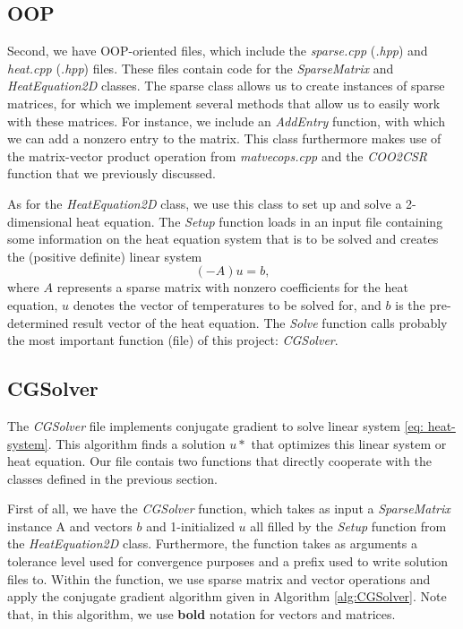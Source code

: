 \documentclass[12pt, a4paper]{article}
\begin{document}
\subsection{OOP}
Second, we have OOP-oriented files, which include the \textit{sparse.cpp} 
(\textit{.hpp}) and \textit{heat.cpp} (\textit{.hpp}) files. These files contain 
code for the \textit{SparseMatrix} and \textit{HeatEquation2D} classes. The 
sparse class allows us to create instances of sparse matrices, for which we 
implement several methods that allow us to easily work with these matrices. For
instance, we include an \textit{AddEntry} function, with which we can add a 
nonzero entry to the matrix. This class furthermore makes use of the 
matrix-vector product operation from \textit{matvecops.cpp} and the 
\textit{COO2CSR} function that we previously discussed. 

As for the \textit{HeatEquation2D} class, we use this class to set up and 
solve a 2-dimensional heat equation. The \textit{Setup} function loads in an
input file containing some information on the heat equation system that is to
be solved and creates the (positive definite) linear system
\begin{equation}
\label{eq: heat-system}
    (-A)u = b,
\end{equation}
where $A$ represents a sparse matrix with nonzero coefficients for the heat 
equation, $u$ denotes the vector of temperatures to be solved for, and $b$ is
the pre-determined result vector of the heat equation. The \textit{Solve} 
function calls probably the most important function (file) of this project:
\textit{CGSolver}.

\subsection{CGSolver}
The \textit{CGSolver} file implements conjugate gradient to solve linear 
system \ref{eq: heat-system}. This algorithm finds a solution $u*$ that 
optimizes this linear system or heat equation. Our file contais two functions 
that directly cooperate with the classes defined in the previous section. 

First of all, we have the \textit{CGSolver} function, which takes as input a 
\textit{SparseMatrix} instance A and vectors $b$ and 1-initialized $u$ all 
filled by the \textit{Setup} function from the \textit{HeatEquation2D} class.
Furthermore, the function takes as arguments a tolerance level used for 
convergence purposes and a prefix used to write solution files to. Within the 
function, we use sparse matrix and vector operations and apply the conjugate 
gradient algorithm given in Algorithm \ref{alg:CGSolver}. Note that, in this 
algorithm, we use \textbf{bold}
notation for vectors and matrices.  
\end{document}
